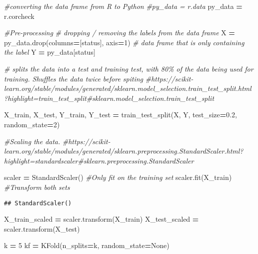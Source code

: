 \documentclass[
]{article}
\newenvironment{Shaded}{\begin{snugshade}}{\end{snugshade}}
\newcommand{\CommentTok}[1]{\textcolor[rgb]{0.56,0.35,0.01}{\textit{#1}}}
\newcommand{\DecValTok}[1]{\textcolor[rgb]{0.00,0.00,0.81}{#1}}
\newcommand{\FloatTok}[1]{\textcolor[rgb]{0.00,0.00,0.81}{#1}}
\newcommand{\NormalTok}[1]{#1}
\newcommand{\OperatorTok}[1]{\textcolor[rgb]{0.81,0.36,0.00}{\textbf{#1}}}
\newcommand{\StringTok}[1]{\textcolor[rgb]{0.31,0.60,0.02}{#1}}
\newcommand{\VariableTok}[1]{\textcolor[rgb]{0.00,0.00,0.00}{#1}}
\begin{document}
\begin{Shaded}
\begin{Highlighting}[]
\CommentTok{\#converting the data frame from R to Python}
\CommentTok{\#py\_data = r.data}
\NormalTok{py\_data }\OperatorTok{=}\NormalTok{ r.corcheck}

\CommentTok{\#Pre{-}processing}
\CommentTok{\#   dropping / removing the labels from the data frame }
\NormalTok{X }\OperatorTok{=}\NormalTok{ py\_data.drop(columns}\OperatorTok{=}\NormalTok{[}\StringTok{\textquotesingle{}status\textquotesingle{}}\NormalTok{], axis}\OperatorTok{=}\DecValTok{1}\NormalTok{)}
\CommentTok{\#   data frame that is only containing the label}
\NormalTok{Y }\OperatorTok{=}\NormalTok{ py\_data[}\StringTok{\textquotesingle{}status\textquotesingle{}}\NormalTok{]}


\CommentTok{\#   splits the data into a test and training test, with 80\% of the data being used for training. Shuffles the data twice before spiting }
\CommentTok{\#https://scikit{-}learn.org/stable/modules/generated/sklearn.model\_selection.train\_test\_split.html?highlight=train\_test\_split\#sklearn.model\_selection.train\_test\_split}

\NormalTok{X\_train, X\_test, Y\_train, Y\_test }\OperatorTok{=}\NormalTok{ train\_test\_split(X, Y, test\_size}\OperatorTok{=}\FloatTok{0.2}\NormalTok{, random\_state}\OperatorTok{=}\DecValTok{2}\NormalTok{)}

\CommentTok{\#Scaling the data. }
\CommentTok{\#https://scikit{-}learn.org/stable/modules/generated/sklearn.preprocessing.StandardScaler.html?highlight=standardscaler\#sklearn.preprocessing.StandardScaler }

\NormalTok{scaler }\OperatorTok{=}\NormalTok{ StandardScaler()}
\CommentTok{\#Only fit on the training set}
\NormalTok{scaler.fit(X\_train)}
\CommentTok{\#Transform both sets}
\end{Highlighting}
\end{Shaded}

\begin{verbatim}
## StandardScaler()
\end{verbatim}

\begin{Shaded}
\begin{Highlighting}[]
\NormalTok{X\_train\_scaled }\OperatorTok{=}\NormalTok{ scaler.transform(X\_train)}
\NormalTok{X\_test\_scaled }\OperatorTok{=}\NormalTok{ scaler.transform(X\_test)}

\NormalTok{k }\OperatorTok{=} \DecValTok{5}
\NormalTok{kf }\OperatorTok{=}\NormalTok{ KFold(n\_splits}\OperatorTok{=}\NormalTok{k, random\_state}\OperatorTok{=}\VariableTok{None}\NormalTok{)}
\end{Highlighting}
\end{Shaded}
\end{document}
